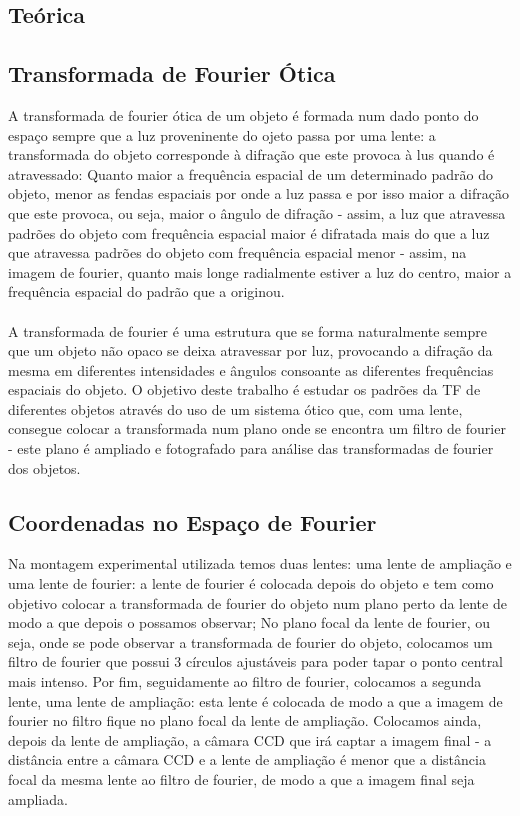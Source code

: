 \documentclass{article}
\begin{document}
\begin{multicols}{2}

\section{Teórica}

\subsection{Transformada de Fourier Ótica}

A transformada de fourier ótica de um objeto é formada num dado ponto do espaço sempre que a luz proveninente do ojeto passa por uma lente: a transformada do objeto corresponde à difração que este provoca à lus quando é atravessado:
Quanto maior a frequência espacial de um determinado padrão do objeto, menor as fendas espaciais por onde a luz passa e por isso maior a difração que este provoca, ou seja, maior o ângulo de difração - assim, a luz que atravessa padrões do objeto com frequência espacial maior é difratada mais do que a luz que atravessa padrões do objeto com frequência espacial menor - assim, na imagem de fourier, quanto mais longe radialmente estiver a luz do centro, maior a frequência espacial do padrão que a originou.
\paragraph{}
A transformada de fourier é uma estrutura que se forma naturalmente sempre que um objeto não opaco se deixa atravessar por luz, provocando a difração da mesma em diferentes intensidades e ângulos consoante as diferentes frequências espaciais do objeto.
O objetivo deste trabalho é estudar os padrões da TF de diferentes objetos através do uso de um sistema ótico que, com uma lente, consegue colocar a transformada num plano onde se encontra um filtro de fourier - este plano é ampliado e fotografado para análise das transformadas de fourier dos objetos.

\subsection{Coordenadas no Espaço de Fourier}

Na montagem experimental utilizada temos duas lentes: uma lente de ampliação e uma lente de fourier: a lente de fourier é colocada depois do objeto e tem como objetivo colocar a transformada de fourier do objeto num plano perto da lente de modo a que depois o possamos observar;
No plano focal da lente de fourier, ou seja, onde se pode observar a transformada de fourier do objeto, colocamos um filtro de fourier que possui 3 círculos ajustáveis para poder tapar o ponto central mais intenso.
Por fim, seguidamente ao filtro de fourier, colocamos a segunda lente, uma lente de ampliação: esta lente é colocada de modo a que a imagem de fourier no filtro fique no plano focal da lente de ampliação. 
Colocamos ainda, depois da lente de ampliação, a câmara CCD que irá captar a imagem final - a distância entre a câmara CCD e a lente de ampliação é menor que a distância focal da mesma lente ao filtro de fourier, de modo a que a imagem final seja ampliada.

\end{multicols}
\end{document}
